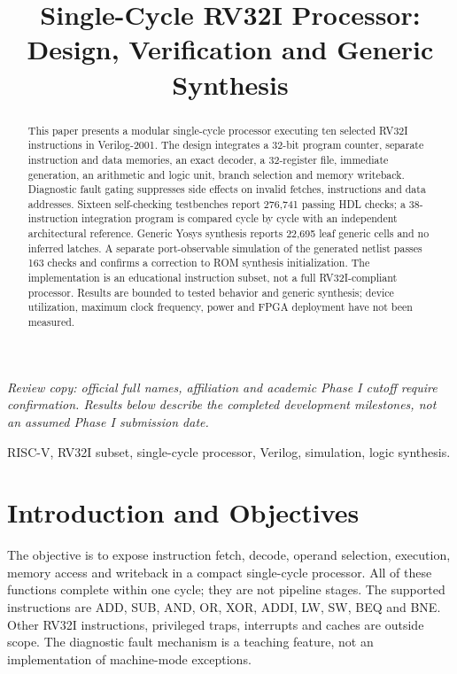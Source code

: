 \documentclass[conference,a4paper]{IEEEtran}
\title{Single-Cycle RV32I Processor:\\Design, Verification and Generic Synthesis}
\author{
\IEEEauthorblockN{Viraj, Kaustubh, Pratyush, Bhargav and Rudraksh}
\IEEEauthorblockA{Student Project Team\\
Affiliation not supplied for this review copy}
}
\begin{document}
\maketitle\thispagestyle{plain}\pagestyle{plain}
\begin{center}\footnotesize\textit{Review copy: official full names, affiliation and academic Phase I cutoff require confirmation. Results below describe the completed development milestones, not an assumed Phase I submission date.}\end{center}

\begin{abstract}
This paper presents a modular single-cycle processor executing ten selected
RV32I instructions in Verilog-2001. The design integrates a 32-bit program
counter, separate instruction and data memories, an exact decoder, a 32-register
file, immediate generation, an arithmetic and logic unit, branch selection and
memory writeback. Diagnostic fault gating suppresses side effects on invalid
fetches, instructions and data addresses. Sixteen self-checking testbenches
report 276,741 passing HDL checks; a 38-instruction integration program is compared
cycle by cycle with an independent architectural reference. Generic Yosys
synthesis reports 22,695 leaf generic cells and no inferred latches. A separate
port-observable simulation of the generated netlist passes 163 checks and
confirms a correction to ROM synthesis initialization. The implementation is an
educational instruction subset, not a full RV32I-compliant processor. Results
are bounded to tested behavior and generic synthesis; device utilization, maximum
clock frequency, power and FPGA deployment have not been measured.
\end{abstract}
\begin{IEEEkeywords}
RISC-V, RV32I subset, single-cycle processor, Verilog, simulation, logic synthesis.
\end{IEEEkeywords}

\section{Introduction and Objectives}
The objective is to expose instruction fetch, decode, operand selection,
execution, memory access and writeback in a compact single-cycle processor.
All of these functions complete within one cycle; they are not pipeline stages.
The supported instructions are ADD, SUB, AND, OR, XOR, ADDI, LW, SW, BEQ and BNE.
Other RV32I instructions, privileged traps, interrupts and caches are outside
scope. The diagnostic fault mechanism is a teaching feature, not an implementation
of machine-mode exceptions.
\end{document}
